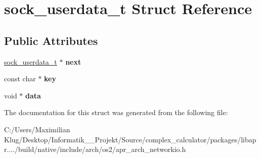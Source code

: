 \hypertarget{structsock__userdata__t}{}\section{sock\+\_\+userdata\+\_\+t Struct Reference}
\label{structsock__userdata__t}
\subsection*{Public Attributes}
\begin{DoxyCompactItemize}
\item 
\mbox{\label{structsock__userdata__t_a7d67d5d0a6470fe1ad6f39f6810c27d5}} 
\mbox{\hyperlink{structsock__userdata__t}{sock\+\_\+userdata\+\_\+t}} $\ast$ {\bfseries next}
\item 
\mbox{\label{structsock__userdata__t_a269c5c5398407ad21bc9650d46d12828}} 
const char $\ast$ {\bfseries key}
\item 
\mbox{\label{structsock__userdata__t_a8f2e13b1566dc2edc2747284afa0736b}} 
void $\ast$ {\bfseries data}
\end{DoxyCompactItemize}


The documentation for this struct was generated from the following file\+:\begin{DoxyCompactItemize}
\item 
C\+:/\+Users/\+Maximilian Klug/\+Desktop/\+Informatik\+\_\+\_\+\+Projekt/\+Source/complex\+\_\+calculator/packages/libapr..../build/native/include/arch/os2/apr\+\_\+arch\+\_\+networkio.\+h\end{DoxyCompactItemize}
